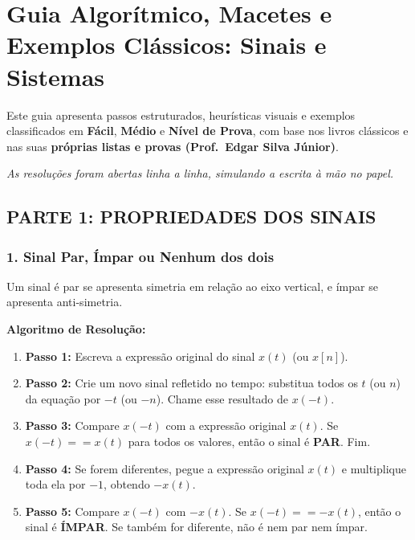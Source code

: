 \chapter{Guia Algorítmico, Macetes e Exemplos Clássicos: Sinais e Sistemas}

Este guia apresenta passos estruturados, heurísticas visuais e exemplos classificados em \textbf{Fácil}, \textbf{Médio} e \textbf{Nível de Prova}, com base nos livros clássicos e nas suas \textbf{próprias listas e provas (Prof.~Edgar Silva Júnior)}.

\emph{As resoluções foram abertas linha a linha, simulando a escrita à mão no papel.}

\section{PARTE 1: PROPRIEDADES DOS SINAIS}\label{parte-1-propriedades-dos-sinais}

\subsection{1. Sinal Par, Ímpar ou Nenhum dos dois}\label{sinal-par-uxedmpar-ou-nenhum-dos-dois}

Um sinal é par se apresenta simetria em relação ao eixo vertical, e ímpar se apresenta anti-simetria.

\textbf{Algoritmo de Resolução:}

\begin{enumerate}
\def\labelenumi{\arabic{enumi}.}
\tightlist
\item
  \textbf{Passo 1:} Escreva a expressão original do sinal \(x(t)\) (ou \(x[n]\)).
\item
  \textbf{Passo 2:} Crie um novo sinal refletido no tempo: substitua todos os \(t\) (ou \(n\)) da equação por \(-t\) (ou \(-n\)). Chame esse resultado de \(x(-t)\).
\item
  \textbf{Passo 3:} Compare \(x(-t)\) com a expressão original \(x(t)\). Se \(x(-t) == x(t)\) para todos os valores, então o sinal é \textbf{PAR}. Fim.
\item
  \textbf{Passo 4:} Se forem diferentes, pegue a expressão original \(x(t)\) e multiplique toda ela por \(-1\), obtendo \(-x(t)\).
\item
  \textbf{Passo 5:} Compare \(x(-t)\) com \(-x(t)\). Se \(x(-t) == -x(t)\), então o sinal é \textbf{ÍMPAR}. Se também for diferente, não é nem par nem ímpar.
\end{enumerate}

